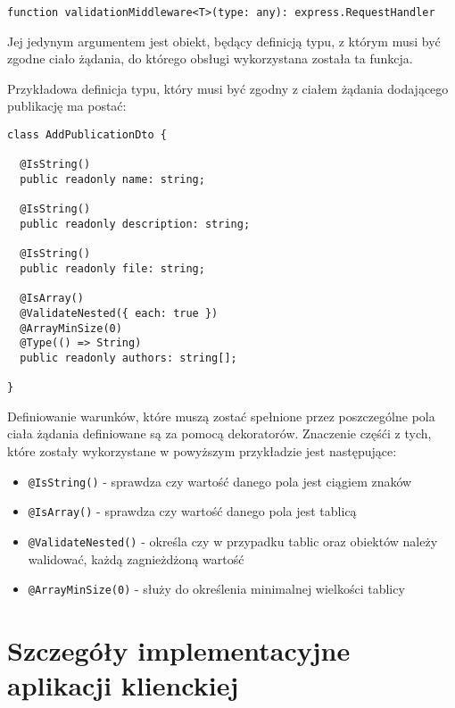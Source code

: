 \documentclass[a4paper,12pt,twoside,openany]{report}
\begin{document}
\begin{verbatim}
function validationMiddleware<T>(type: any): express.RequestHandler
\end{verbatim}

Jej jedynym argumentem jest obiekt, będący definicją typu, z którym musi być zgodne ciało żądania, do którego obsługi wykorzystana została ta funkcja.

Przykładowa definicja typu, który musi być zgodny z ciałem żądania dodającego publikację ma postać: 
\begin{verbatim}
class AddPublicationDto {

  @IsString()
  public readonly name: string;

  @IsString()
  public readonly description: string;
  
  @IsString()
  public readonly file: string;

  @IsArray()
  @ValidateNested({ each: true })
  @ArrayMinSize(0)
  @Type(() => String)        
  public readonly authors: string[];

}
\end{verbatim}
Definiowanie warunków, które muszą zostać spełnione przez poszczególne pola ciała żądania definiowane są za pomocą dekoratorów. Znaczenie częśći z tych, które zostały wykorzystane w powyższym przykładzie jest następujące: 
\begin{itemize}
	\item \verb|@IsString()| - sprawdza czy wartość danego pola jest ciągiem znaków
	\item \verb|@IsArray()| - sprawdza czy wartość danego pola jest tablicą 
	\item \verb|@ValidateNested()| - określa czy w przypadku tablic oraz obiektów należy walidować, każdą zagnieżdżoną wartość 
	\item \verb|@ArrayMinSize(0)| - służy do określenia minimalnej wielkości tablicy
\end{itemize}

\chapter{Szczegóły implementacyjne aplikacji klienckiej}

\begin{thebibliography}{99}



\end{thebibliography}

\zakonczenie  %
\end{document}
